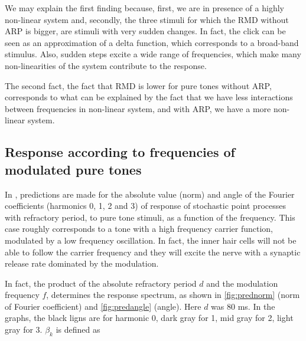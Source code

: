 
We may explain the first finding because, first, we are in presence of a highly 
non-linear system and, 
secondly, the three stimuli for which the RMD without ARP is bigger, 
are stimuli with very sudden changes. 
In fact, the click can be seen as an approximation of a delta function, 
which corresponds to a broad-band stimulus. 
Also, sudden steps excite a wide range of frequencies, 
which make many non-linearities of the system contribute to the response.


The second fact, the fact that RMD is lower for pure tones without ARP, 
corresponds to what can be explained by the fact that we have less 
interactions between frequencies in non-linear system,
and with ARP, we have a more non-linear system.

\subsection{Response according to frequencies of modulated pure tones}

In \cite{Deger}, predictions are made for the absolute value (norm) and angle of the Fourier coefficients 
(harmonics 0, 1, 2 and 3) of response of stochastic point processes with refractory period,
to pure tone stimuli, as a function of the frequency. 
This case roughly corresponds to a tone with a high frequency carrier function, 
modulated by a low frequency oscillation. 
In fact, the inner hair cells will not be able to follow the carrier frequency 
and they will excite the nerve with a synaptic release rate dominated by the modulation.

In fact, the product of the absolute refractory period $d$ and the modulation frequency $f$,
determines the response spectrum, as shown in \autoref{fig:prednorm} (norm of Fourier coefficient) and 
\autoref{fig:predangle} (angle). Here $d$ was 80 ms. 
In the graphs, the black ligns are for harmonic 0, dark gray for 1, mid gray for 2, light gray for 3.
$\beta_k$ is defined as 

